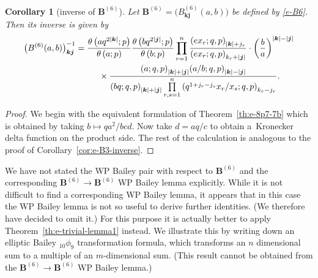 \documentclass[pdftex]{sigma}
\numberwithin{equation}{section}
\newtheorem{Corollary}[Theorem]{Corollary}
\newcommand\sumj{{\left| \boldsymbol {j} \right|}}
\newcommand\sumk{{\left| \boldsymbol{k} \right|}}
\newcommand{\B}{{ \mathbf B}}
\renewcommand{\k}{{ \boldsymbol{k}}}
\renewcommand{\j}{{ \boldsymbol{j}}}
\newcommand{\sqprod}[1]{\prod\limits_{r, s =1}^{#1}} %
\newcommand{\smallprod}[1]{\prod\limits_{r =1}^{#1}} %
\newcommand{\xover}[1]{#1_{r}/#1_{s}}
\newcommand{\ellipticqrfac}[2]{{\left({#1}; q, p\right)_{#2}}} %
\newcommand{\elliptictheta}[1]{\theta \left({#1} ; p\right) }
\begin{document}
\begin{Corollary}[inverse of $\B^{(6)}$] Let $\B^{(6)}= \big(B^{(6)}_{\k\j}(a,b)\big)$ be defined by \eqref{e-B6}. Then its inverse is given by
\begin{gather*}
\big(B^{(6)}(a,b)\big)_{\k \j}^{-1} = \frac{\elliptictheta{aq^{2\sumk}}}{\elliptictheta{a}}
\frac{\elliptictheta{bq^{2\sumj}}}{\elliptictheta{b}}
 \smallprod n \frac{\ellipticqrfac{ex_r}{\sumk+j_r}}
 {\ellipticqrfac{ex_r}{k_r+\sumj}}
\cdot \left( \frac{b}{a}\right)^{\sumk-\sumj}\notag\\
\hphantom{\big(B^{(6)}(a,b)\big)_{\k \j}^{-1} =}{} \times \frac{\ellipticqrfac{a}{\sumk+\sumj}
\ellipticqrfac{a/b}{\sumk-\sumj}} {\ellipticqrfac{bq}{\sumk+\sumj} \sqprod n \ellipticqrfac{q^{1+j_r-j_s}\xover x }{k_r-j_r} }.%
\end{gather*}
\end{Corollary}
\begin{proof} We begin with the equivalent formulation of Theorem~\ref{th:e-8p7-7b} which is obtained by taking $b\mapsto qa^2/bcd$. Now take $d=aq/c$ to obtain a~Kronecker delta function on the product side. The rest of the calculation is analogous to the proof of Corollary~\ref{cor:e-B3-inverse}.
\end{proof}

We have not stated the WP Bailey pair with respect to $\B^{(6)}$ and the corresponding $\B^{(6)} \to\B^{(6)}$ WP Bailey lemma explicitly. While it is not difficult to find a corresponding WP Bailey lemma, it appears that in this case the WP Bailey lemma is not so useful to derive further identities. (We therefore have decided to omit it.) For this purpose it is actually better to apply Theorem~\ref{th:e-trivial-lemma1} instead. We illustrate this by writing down an elliptic Bailey $_{10}\phi_9$ transformation formula, which transforms an $n$ dimensional sum to a multiple of an $m$-dimensional sum. (This result cannot be obtained from the $\B^{(6)} \to\B^{(6)}$ WP Bailey lemma.)
\end{document}
